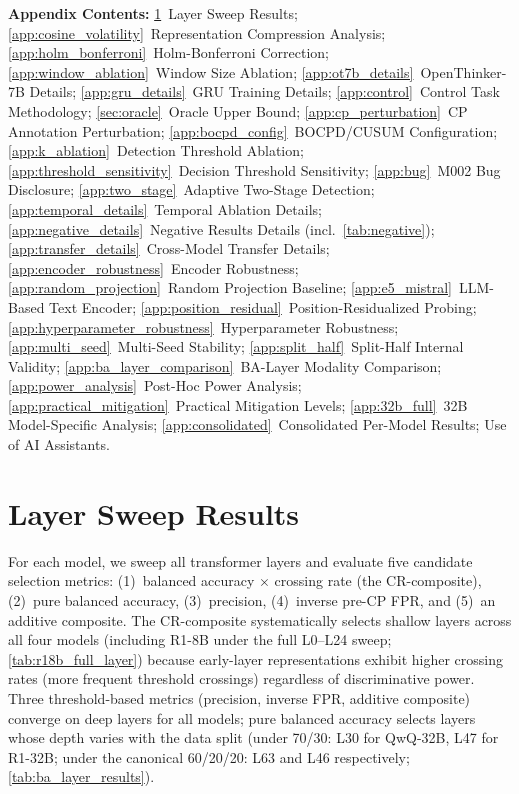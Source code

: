 \appendix

\noindent\textbf{Appendix Contents:}
\cref{app:layer_sweep}~Layer Sweep Results;
\cref{app:cosine_volatility}~Representation Compression Analysis;
\cref{app:holm_bonferroni}~Holm-Bonferroni Correction;
\cref{app:window_ablation}~Window Size Ablation;
\cref{app:ot7b_details}~OpenThinker-7B Details;
\cref{app:gru_details}~GRU Training Details;
\cref{app:control}~Control Task Methodology;
\cref{sec:oracle}~Oracle Upper Bound;
\cref{app:cp_perturbation}~CP Annotation Perturbation;
\cref{app:bocpd_config}~BOCPD/CUSUM Configuration;
\cref{app:k_ablation}~Detection Threshold Ablation;
\cref{app:threshold_sensitivity}~Decision Threshold Sensitivity;
\cref{app:bug}~M002 Bug Disclosure;
\cref{app:two_stage}~Adaptive Two-Stage Detection;
\cref{app:temporal_details}~Temporal Ablation Details;
\cref{app:negative_details}~Negative Results Details (incl.\ \cref{tab:negative});
\cref{app:transfer_details}~Cross-Model Transfer Details;
\cref{app:encoder_robustness}~Encoder Robustness;
\cref{app:random_projection}~Random Projection Baseline;
\cref{app:e5_mistral}~LLM-Based Text Encoder;
\cref{app:position_residual}~Position-Residualized Probing;
\cref{app:hyperparameter_robustness}~Hyperparameter Robustness;
\cref{app:multi_seed}~Multi-Seed Stability;
\cref{app:split_half}~Split-Half Internal Validity;
\cref{app:ba_layer_comparison}~BA-Layer Modality Comparison;
\cref{app:power_analysis}~Post-Hoc Power Analysis;
\cref{app:practical_mitigation}~Practical Mitigation Levels;
\cref{app:32b_full}~32B Model-Specific Analysis;
\cref{app:consolidated}~Consolidated Per-Model Results;
Use of AI Assistants.

\section{Layer Sweep Results}
\label{app:layer_sweep}

For each model, we sweep all transformer layers and evaluate five candidate selection metrics: (1)~balanced accuracy $\times$ crossing rate (the CR-composite), (2)~pure balanced accuracy, (3)~precision, (4)~inverse pre-CP FPR, and (5)~an additive composite. The CR-composite systematically selects shallow layers across all four models (including R1-8B under the full L0--L24 sweep; \cref{tab:r18b_full_layer}) because early-layer representations exhibit higher crossing rates (more frequent threshold crossings) regardless of discriminative power. Three threshold-based metrics (precision, inverse FPR, additive composite) converge on deep layers for all models; pure balanced accuracy selects layers whose depth varies with the data split (under 70/30: L30 for QwQ-32B, L47 for R1-32B; under the canonical 60/20/20: L63 and L46 respectively; \cref{tab:ba_layer_results}).

